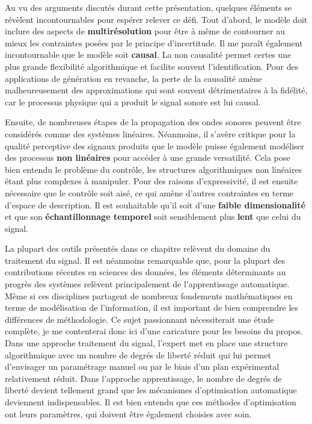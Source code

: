 Au vu des arguments discutés durant cette présentation, quelques éléments se révèlent incontournables pour espérer relever ce défi. Tout d'abord, le modèle doit inclure des aspects de \textbf{multirésolution} pour être à même de contourner au mieux les contraintes posées par le principe d'incertitude. Il me paraît également incontournable que le modèle soit \textbf{causal}. La non causalité permet certes une plus grande flexibilité algorithmique et facilite souvent l'identification. Pour des applications de génération en revanche, la perte de la causalité amène malheureusement des approximations qui sont souvent détrimentaires à la fidélité, car le processus physique qui a produit le signal sonore est lui causal.

Ensuite, de nombreuses étapes de la propagation des ondes sonores peuvent être considérés comme des systèmes linéaires. Néanmoins, il s'avère critique pour la qualité perceptive des signaux produits que le modèle puisse également modéliser des processus \textbf{non linéaires} pour accéder à une grande versatilité. Cela pose bien entendu le problème du contrôle, les structures algorithmiques non linéaires étant plus complexes à manipuler. Pour des raisons d'expressivité, il est ensuite nécessaire que le contrôle soit aisé, ce qui amène d'autres contraintes en terme d'espace de description. Il est souhaitable qu'il soit d'une \textbf{faible dimensionalité} et que son \textbf{échantillonnage temporel} soit sensiblement plus \textbf{lent} que celui du signal.

La plupart des outils présentés dans ce chapitre relèvent du domaine du traitement du signal. Il est néanmoins remarquable que, pour la plupart des contributions récentes en sciences des données, les éléments déterminants au progrès des systèmes relèvent principalement de l'apprentissage automatique. Même si ces disciplines partagent de nombreux fondements mathématiques en terme de modélisation de l'information, il est important de bien comprendre les différences de méthodologie. Ce sujet passionnant nécessiterait une étude complète, je me contenterai donc ici d'une caricature pour les besoins du propos. Dans une approche traitement du signal, l'expert met en place une structure algorithmique avec un nombre de degrés de liberté réduit qui lui permet d'envisager un paramétrage manuel ou par le biais d'un plan expérimental relativement réduit. Dans l'approche apprentissage, le nombre de degrés de liberté devient tellement grand que les mécanismes d'optimisation automatique deviennent indispensables. Il est bien entendu que ces méthodes d'optimisation ont leurs paramètres, qui doivent être également choisies avec soin.


